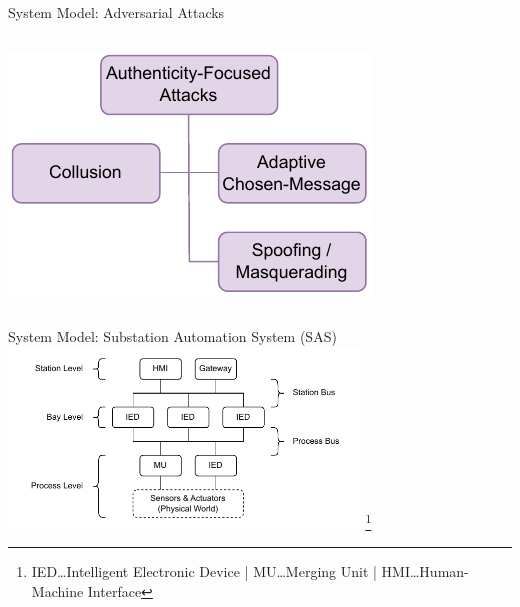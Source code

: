 \documentclass[en]{sdqbeamer}
\newcommand\nonumberfootnote[1]{%
  \begingroup
  \renewcommand\thefootnote{}\footnote{#1}%
  \addtocounter{footnote}{-1}%
  \endgroup
}
\begin{document}
\begin{frame}{System Model: Adversarial Attacks}
\begin{columns}
        \centering
        \includegraphics[width=\linewidth]{figures/attacks_authenticity.drawio.pdf}
    \end{columns}
\end{frame}
\begin{frame}{System Model: Substation Automation System (SAS)}
    \centering
    \includegraphics[width=0.7\textwidth]{./figures/substation_architecture.drawio.pdf}
    \nonumberfootnote{IED\dots Intelligent Electronic Device | MU\dots Merging Unit | HMI\dots Human-Machine Interface}
\end{frame}
\end{document}
